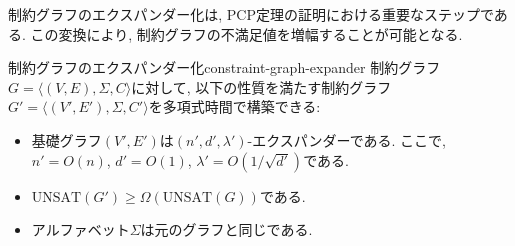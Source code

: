 制約グラフのエクスパンダー化は, PCP定理の証明における重要なステップである. この変換により, 制約グラフの不満足値を増幅することが可能となる.

\begin{lemma}{制約グラフのエクスパンダー化}{constraint-graph-expander}
  制約グラフ$G=\langle(V,E),\Sigma,C\rangle$に対して, 以下の性質を満たす制約グラフ$G'=\langle(V',E'),\Sigma,C'\rangle$を多項式時間で構築できる:
  \begin{itemize}
  \item 基礎グラフ$(V',E')$は$(n',d',\lambda')$-エクスパンダーである. ここで, $n'=O(n)$, $d'=O(1)$, $\lambda'=O(1/\sqrt{d'})$である.
  \item $\mathrm{UNSAT}(G') \ge \Omega(\mathrm{UNSAT}(G))$である.
  \item アルファベット$\Sigma$は元のグラフと同じである.
  \end{itemize}
\end{lemma}

